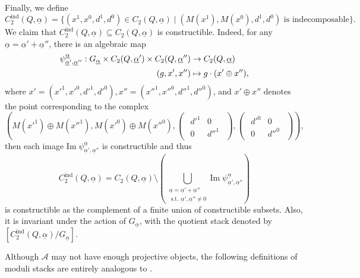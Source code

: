 \documentclass[12pt]{amsart}
\theoremstyle{definition}
\numberwithin{equation}{section}
\begin{document}
Finally, we define
\[ C_2^{\mathrm{ind}}(Q,\underline{\alpha}) =\{(x^1,x^0,d^1,d^0) \in C_2(Q,\underline{\alpha}) \mid (M(x^1),M(x^0),d^1,d^0) \text{ is indecomposable} \}. \]
We claim that $ C_2^{\mathrm{ind}}(Q,\underline{\alpha}) \subseteq C_2(Q,\underline{\alpha}) $ is constructible. 
Indeed, for any $ \underline{\alpha} = \underline{\alpha}'+\underline{\alpha}''$, there is an algebraic map
\begin{align}
    \label{psiaa'a''}
    \psi_{\underline{\alpha}',\underline{\alpha}''}^{\underline{\alpha}} : G_{\underline{\alpha}} \times  C_2(Q,\underline{\alpha}') \times   C_2(Q,\underline{\alpha}'') &\to  C_2(Q,\underline{\alpha}) \\
    (g,x',x'')&\mapsto g \cdot (x' \oplus x''), \notag
\end{align}
where $ x'= (x'^1,x'^0,d'^1,d'^0), x''= (x''^1,x''^0,d''^1,d''^0) $, and $ x' \oplus x'' $ denotes the point corresponding to the complex 
\[(M(x'^1) \oplus M(x''^1),M(x'^0) \oplus M(x''^0),\begin{pmatrix}
        \begin{smallmatrix}
            d'^1 & 0 \\
            0 & d''^1
        \end{smallmatrix}
    \end{pmatrix},\begin{pmatrix}
        \begin{smallmatrix}
            d'^0 & 0 \\
            0 & d''^0
        \end{smallmatrix}
         \end{pmatrix}),\]
then each image $ \mathrm{Im}\;\psi_{\underline{\alpha}',\underline{\alpha}''}^{\underline{\alpha}} $ is constructible and thus
\[C_2^{\mathrm{ind}}(Q,\underline{\alpha}) = C_2(Q,\underline{\alpha}) \setminus(\bigcup_{\substack{\underline{\alpha}= \underline{\alpha}'+\underline{\alpha}''\\\text{ s.t. } \underline{\alpha}',\underline{\alpha}'' \neq 0 }   
}\mathrm{Im}\;\psi_{\underline{\alpha}',\underline{\alpha}''}^{\underline{\alpha}})\]
is constructible as the complement of a finite union of constructible subsets. 
Also, it is invariant under the action of $ G_{\underline{\alpha}} $, with the quotient stack denoted by $ [C_2^{\mathrm{ind}}(Q,\underline{\alpha})/G_{\underline{\alpha}}] $.



Although $ \mathcal{A} $ may not have enough projective objects, the following definitions of moduli stacks are entirely analogous to \cite[Section 4.1, 4.2]{FLX24}.
\end{document}
